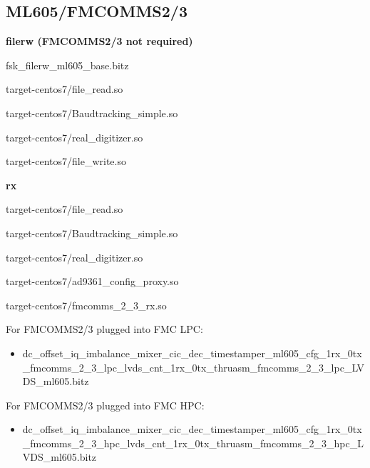 \begin{appendices}
\pagebreak
\subsection{ML605/FMCOMMS2/3}
	\textbf{filerw (FMCOMMS2/3 not required)}
	\begin{itemize}
	\begin{minipage}[t]{.5\textwidth}
	\item fsk\_filerw\_ml605\_base.bitz
	\item target-centos7/file\_read.so
	\item target-centos7/Baudtracking\_simple.so
	\end{minipage}
	\begin{minipage}[t]{.5\textwidth}
	\item target-centos7/real\_digitizer.so
	\item target-centos7/file\_write.so
	\end{minipage}
	\end{itemize}

	\textbf{rx}
	\begin{itemize}
	\begin{minipage}[t]{.5\textwidth}
	\item target-centos7/file\_read.so
	\item target-centos7/Baudtracking\_simple.so
	\item target-centos7/real\_digitizer.so
	\end{minipage}
	\begin{minipage}[t]{.5\textwidth}
	\item target-centos7/ad9361\_config\_proxy.so
	\item target-centos7/fmcomms\_2\_3\_rx.so
	\end{minipage}
	\end{itemize}
	For FMCOMMS2/3 plugged into FMC LPC:
	\begin{itemize}
	\item dc\_offset\_iq\_imbalance\_mixer\_cic\_dec\_timestamper\_ml605\_cfg\_1rx\_0tx \\
\_fmcomms\_2\_3\_lpc\_lvds\_cnt\_1rx\_0tx\_thruasm\_fmcomms\_2\_3\_lpc\_LVDS\_ml605.bitz
	\end{itemize}
	For FMCOMMS2/3 plugged into FMC HPC:
	\begin{itemize}
	\item dc\_offset\_iq\_imbalance\_mixer\_cic\_dec\_timestamper\_ml605\_cfg\_1rx\_0tx \\
\_fmcomms\_2\_3\_hpc\_lvds\_cnt\_1rx\_0tx\_thruasm\_fmcomms\_2\_3\_hpc\_LVDS\_ml605.bitz
	\end{itemize}


\end{appendices}
